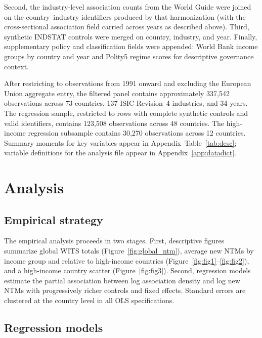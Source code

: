 \documentclass[12pt,letterpaper]{article}
\newcommand{\Nfull}{337{,}542}
\newcommand{\Nreg}{123{,}508}
\newcommand{\Nhi}{30{,}270}
\newcommand{\CountriesFull}{73}
\newcommand{\CountriesReg}{48}
\newcommand{\CountriesHi}{12}
\newcommand{\Industries}{137}
\newcommand{\Years}{34}
\begin{document}
Second, the industry-level association counts from the World Guide were joined on the country--industry identifiers produced by that harmonization (with the cross-sectional association field carried across years as described above). Third, synthetic INDSTAT controls were merged on country, industry, and year. Finally, supplementary policy and classification fields were appended: World Bank income groups by country and year \citep{wb2024} and Polity5 regime scores \citep{marshall2019} for descriptive governance context.

After restricting to observations from 1991 onward and excluding the European Union aggregate entry, the filtered panel contains approximately \Nfull{} observations across \CountriesFull{} countries, \Industries{} ISIC Revision~4 industries, and \Years{} years. The regression sample, restricted to rows with complete synthetic controls and valid identifiers, contains \Nreg{} observations across \CountriesReg{} countries. The high-income regression subsample contains \Nhi{} observations across \CountriesHi{} countries. Summary moments for key variables appear in Appendix~Table~\ref{tab:desc}; variable definitions for the analysis file appear in Appendix~\ref{app:datadict}.

\section{Analysis}

\subsection{Empirical strategy}

The empirical analysis proceeds in two stages. First, descriptive figures summarize global WITS totals (Figure~\ref{fig:global_ntm}), average new NTMs by income group and relative to high-income countries (Figure~\ref{fig:fig1}--\ref{fig:fig2}), and a high-income country scatter (Figure~\ref{fig:fig3}). Second, regression models estimate the partial association between log association density and log new NTMs with progressively richer controls and fixed effects. Standard errors are clustered at the country level in all OLS specifications.

\subsection{Regression models}
\end{document}
